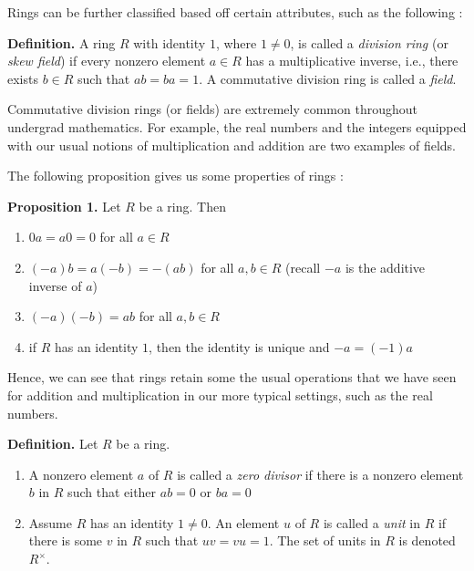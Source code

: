 \documentclass[11pt, reqno]{amsart}
\theoremstyle{plain}
\theoremstyle{definition}
\theoremstyle{example}
\begin{document}
Rings can be further classified based off certain attributes, such as the following \cite[\S 7.1, p. 224]{dummit}:

\par
\textbf{Definition.} A ring $R$ with identity $1$, where $1 \neq 0$, is called a \textit{division ring} (or \textit{skew field}) if every nonzero element $a \in R$ has a multiplicative inverse, i.e., there exists $b \in R$ such that $ab = ba = 1$. A commutative division ring is called a \textit{field}.

\par
Commutative division rings (or fields) are extremely common throughout undergrad mathematics. For example, the real numbers and the integers equipped with our usual notions of multiplication and addition are two examples of fields.

\par
The following proposition gives us some properties of rings \cite[\S 7.1, p. 236]{dummit}:

\par
\textbf{Proposition 1.} Let $R$ be a ring. Then
\begin{enumerate}
\item $0a = a0 = 0$ for all $a \in R$
\item $(-a)b = a(-b) = -(ab)$ for all $a, b \in R$ (recall $-a$ is the additive inverse of $a$)
\item $(-a)(-b) = ab$ for all $a, b \in R$
\item if $R$ has an identity $1$, then the identity is unique and $-a = (-1)a$
\end{enumerate}

Hence, we can see that rings retain some the usual operations that we have seen for addition and multiplication in our more typical settings, such as the real numbers. 

\par
\textbf{Definition.} Let $R$ be a ring.
\begin{enumerate}
\item A nonzero element $a$ of $R$ is called a \textit{zero divisor} if there is a nonzero element $b$ in $R$ such that either $ab = 0$ or $ba = 0$

\item Assume $R$ has an identity $1 \neq 0$. An element $u$ of $R$ is called a \textit{unit} in $R$ if there is some $v$ in $R$ such that $uv = vu = 1$. The set of units in $R$ is denoted $R^{\times}$. 
\end{enumerate}
\end{document}
